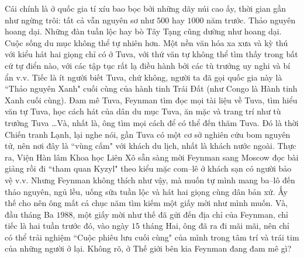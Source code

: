 \begin{multicols}{2}
\begin{figure}[H]
		\end{figure}
	Cái chính là ở quốc gia tí xíu bao bọc bởi những dãy núi cao ấy, thời gian gần như ngừng trôi: tất cả vẫn nguyên sơ như $500$ hay $1000$ năm trước. Thảo nguyên hoang dại. Những đàn tuần lộc hay bò Tây Tạng cũng dường như hoang dại. Cuộc sống du mục không thể tự nhiên hơn. Một nền văn hóa xa xưa và kỳ thú với kiểu hát hai giọng chỉ có ở Tuva, với thứ văn tự không thể tìm thấy trong bất cứ tự điển nào, với các tập tục rất lạ điều hành bởi các tù trưởng uy nghi và bí ẩn v.v. Tiếc là ít người biết Tuva, chứ không, người ta đã gọi quốc gia này là ``Thảo nguyên Xanh" cuối cùng của hành tinh Trái Đất (như Congo là Hành tinh Xanh cuối cùng). Đam mê Tuva, Feynman tìm đọc mọi tài liệu về Tuva, tìm hiểu văn tự Tuva, học cách hát của dân du mục Tuva, ăn mặc và trang trí như tù trưởng Tuva \ldots Và, nhất là, ông tìm mọi cách để có thể đến thăm Tuva.
	\vskip 0.1cm
	Đó là thời Chiến tranh Lạnh, lại nghe nói, gần Tuva có một cơ sở nghiên cứu bom nguyên tử, nên nơi đây là ``vùng cấm" với khách du lịch, nhất là khách nước ngoài. Thực ra, Viện Hàn lâm Khoa học Liên Xô sẵn sàng mời Feynman sang Moscow  đọc bài giảng rồi đi ``tham quan Kyzyl" theo kiểu mặc com--lê ở khách sạn có người bảo vệ v.v. Nhưng Feynman không thích như vậy, mà muốn tự mình mang ba--lô đến thảo nguyên, ngủ lều, uống sữa tuần lộc và hát hai giọng cùng dân bản xứ. Ấy thế cho nên ông mất cả chục năm tìm kiếm một giấy mời như mình muốn. Và, đầu tháng Ba $1988$, một giấy mời như thế đã gửi đến địa chỉ của Feynman, chỉ tiếc là hai tuần trước đó, vào ngày $15$ tháng Hai, ông đã ra đi mãi mãi, nên chỉ có thể trải nghiệm ``Cuộc phiêu lưu cuối cùng" của mình trong tâm trí và trái tim của những người ở lại. Không rõ, ở Thế giới bên kia Feynman đang đam mê gì?
\end{multicols}